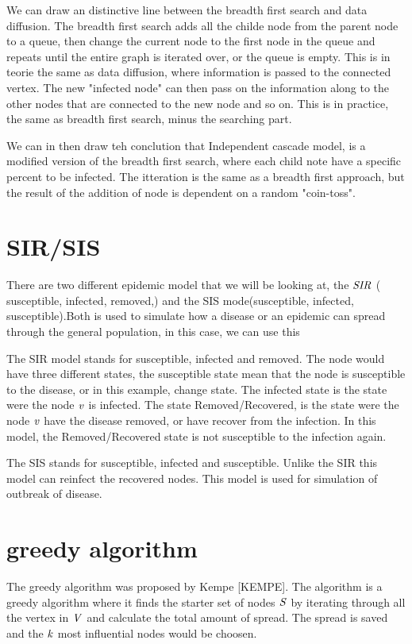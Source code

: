 We can draw an distinctive line between the breadth first search and data diffusion. The breadth first search adds all the childe node from the parent node to a queue, then change the current node to the first node in the queue and repeats until the entire graph is iterated over, or the queue is empty. This is in teorie the same as data diffusion, where information is passed to the connected vertex. The new "infected node" can then pass on the information along to the other nodes that are connected to the new node and so on. This is in practice, the same as breadth first search, minus the searching part. 

We can in then draw teh conclution that Independent cascade model, is a modified version of the breadth first search, where each child note have a specific percent to be infected. The itteration is the same as a breadth first approach, but the result of the addition of node is dependent on a random "coin-toss".



\section{SIR/SIS}
There are two different epidemic model that we will be looking at, the $\it{SIR}$ ( susceptible, infected, removed,) and the SIS mode(susceptible, infected, susceptible).Both is used to simulate how a disease or an epidemic can spread through the general population, in this case, we can use this 

The SIR model stands for susceptible, infected and removed. The node would have three different states, the susceptible state mean that the node is susceptible to the disease, or in this example, change state. The infected state is the state were the node $\it{v}$ is infected. The state Removed/Recovered, is the state were the node $\it{v}$ have the disease removed, or have recover from the infection. In this model, the Removed/Recovered state is not susceptible to the infection again. 

The SIS stands for susceptible, infected and susceptible. Unlike the SIR this model can reinfect the recovered nodes. This model is used for simulation of outbreak of disease. 

\section{greedy algorithm}
The  greedy algorithm was proposed by Kempe [KEMPE]. The algorithm is a greedy algorithm where it finds the starter set of nodes $\it{S}$ by iterating through all the vertex in $\it{V}$ and calculate the total amount of spread. The spread is saved and the $\it{k}$ most influential nodes would be choosen.

